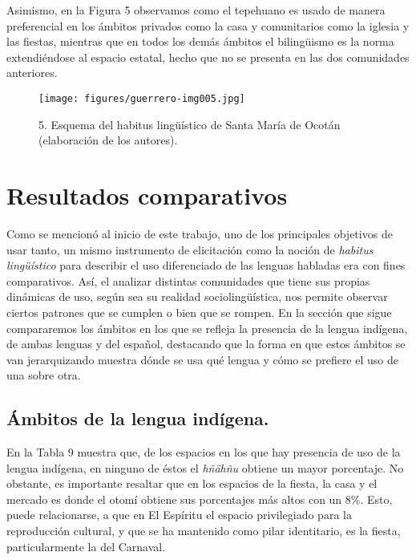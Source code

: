 \documentclass[output=paper]{../langscibook}
\begin{document}
Asimismo, en la Figura 5 observamos como el tepehuano es usado de manera preferencial en los ámbitos privados como la casa y comunitarios como la iglesia y las fiestas, mientras que en todos los demás ámbitos el bilingüismo es la norma extendiéndose al espacio estatal, hecho que no se presenta en las dos comunidades anteriores.




\begin{figure}
\caption{\label{fig:}5. Esquema del habitus lingüístico de Santa María de Ocotán (elaboración de los autores).}
\texttt{[image: figures/guerrero-img005.jpg]}
\end{figure}


 \section{Resultados comparativos}


Como se mencionó al inicio de este trabajo, uno de los principales objetivos de usar tanto, un mismo instrumento de elicitación como la noción de \textit{habitus lingüístico} para describir el uso diferenciado de las lenguas habladas era con fines comparativos. Así, el analizar distintas comunidades que tiene sus propias dinámicas de uso, según sea su realidad sociolingüística, nos permite observar ciertos patrones que se cumplen o bien que se rompen. En la sección que sigue compararemos los ámbitos en los que se refleja la presencia de la lengua indígena, de ambas lenguas y del español, destacando que la forma en que estos ámbitos se van jerarquizando muestra dónde se usa qué lengua y cómo se prefiere el uso de una sobre otra.



 \subsection{Ámbitos de la lengua indígena.}



En la Tabla 9 muestra que, de los espacios en los que hay presencia de uso de la lengua indígena, en ninguno de éstos el \textit{hñähñu} obtiene un mayor porcentaje. No obstante, es importante resaltar que en los espacios de la fiesta, la casa y el mercado es donde el otomí obtiene sus porcentajes más altos con un 8\%. Esto, puede relacionarse, a que en El Espíritu el espacio privilegiado para la reproducción cultural, y que se ha mantenido como pilar identitario, es la fiesta, particularmente la del Carnaval.
\end{document}
